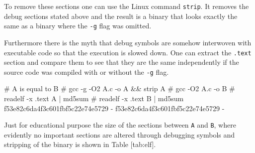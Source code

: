 To remove these sections one can use the Linux command {\tt strip}. It
removes the debug sections stated above and the result is a binary
that looks exactly the same as a binary where the {\tt -g} flag was
omitted.

Furthermore there is the myth that debug symbols are somehow
interwoven with executable code so that the execution is slowed
down. One can extract the {\tt .text} section and compare them to
see that they are the same independently if the source code
was compiled with or without the {\tt -g} flag.

\starttyping
# A is equal to B
# gcc -g -O2 A.c -o A && strip A
# gcc    -O2 A.c -o B
# readelf -x .text A | md5sum
# readelf -x .text B | md5sum
f53e82c6da4f3c601fbf5c22e74e5729  -
f53e82c6da4f3c601fbf5c22e74e5729  -
\stoptyping

Just for educational purpose the size of the sections between {\tt A} and
{\tt B}, where evidently no important sections are altered through
debugging symbols and stripping of the binary is shown in Table [tab:elf].



